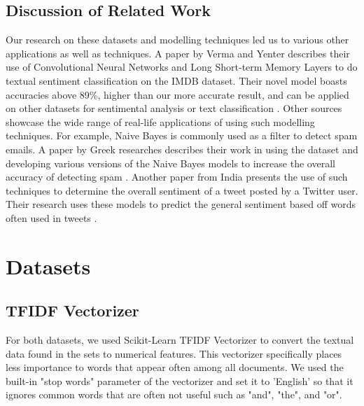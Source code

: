 \documentclass{homework}
\begin{document}
\subsection{Discussion of Related Work}
Our research on these datasets and modelling techniques led us to various other applications as well as techniques. A paper by Verma and Yenter describes their use of Convolutional Neural Networks and Long Short-term Memory Layers to do textual sentiment classification on the IMDB dataset. Their novel model boasts accuracies above 89\%, higher than our more accurate result, and can be applied on other datasets for sentimental analysis or text classification \cite{yenter2017deep}. Other sources showcase the wide range of real-life applications of using such modelling techniques. For example, Naive Bayes is commonly used as a filter to detect spam emails. A paper by Greek researches describes their work in using the dataset and developing various versions of the Naive Bayes models to increase the overall accuracy of detecting spam \cite{metsis2006spam}. Another paper from India presents the use of such techniques to determine the overall sentiment of a tweet posted by a Twitter user. Their research uses these models to predict the general sentiment based off words often used in tweets \cite{vadivukarassi2017sentimental}.

\section{Datasets}

\subsection{TFIDF Vectorizer}\label{TFDIF Vectorizer}
For both datasets, we used Scikit-Learn TFIDF Vectorizer to convert the textual data found in the sets to numerical features. This vectorizer specifically places less importance to words that appear often among all documents. We used the built-in "stop words" parameter of the vectorizer and set it to 'English' so that it ignores common words that are often not useful such as "and", "the", and "or". 
\end{document}
